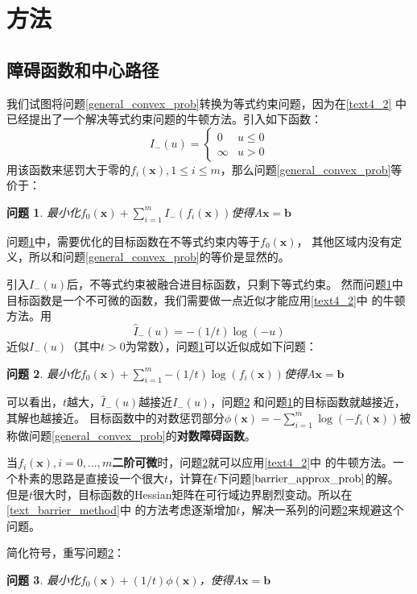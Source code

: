 \documentclass{article}
\newtheorem{problem}{问题}
\begin{document}
\section{方法}
\subsection{障碍函数和中心路径}
我们试图将问题\ref{general_convex_prob}转换为等式约束问题，因为在\ref{text4_2}
中已经提出了一个解决等式约束问题的牛顿方法。引入如下函数：
$$I_-(u)=\begin{cases}
    0 & u\le 0 \\
    \infty & u > 0
\end{cases}$$
用该函数来惩罚大于零的$f_i(\bm x),1\le i\le m$，那么问题\ref{general_convex_prob}等价于：
\begin{problem}
最小化$f_0(\bm x)+\sum_{i=1}^m{I_-(f_i(\bm x))}$使得$A\bm x=\bm b$
\label{barrier_problem}
\end{problem}

问题\ref{barrier_problem}中，需要优化的目标函数在不等式约束内等于$f_0(\bm x)$，
其他区域内没有定义，所以和问题\ref{general_convex_prob}的等价是显然的。

引入$I_-(u)$后，不等式约束被融合进目标函数，只剩下等式约束。
然而问题\ref{barrier_problem}中目标函数是一个不可微的函数，我们需要做一点近似才能应用\ref{text4_2}中
的牛顿方法。用
$$\widehat I_-(u)=-(1/t)\log(-u)$$
近似$I_-(u)$（其中$t>0$为常数），问题\ref{barrier_problem}可以近似成如下问题：
\begin{problem}
    最小化$f_0(\bm x)+\sum_{i=1}^m{-(1/t)\log(f_i(\bm x))}$使得$A\bm x=\bm b$
    \label{barrier_approx_prob}
\end{problem}

可以看出，$t$越大，$\widehat I_-(u)$越接近$I_-(u)$，问题\ref{barrier_approx_prob}
和问题\ref{barrier_problem}的目标函数就越接近，其解也越接近。
目标函数中的对数惩罚部分$\phi(\bm x)=-\sum_{i=1}^m\log (-f_i(\bm x))$被称做问题\ref{general_convex_prob}的\textbf{对数障碍函数}。

当$f_i(\bm x),i=0,...,m$\textbf{二阶可微}时，问题\ref{barrier_approx_prob}就可以应用\ref{text4_2}中
的牛顿方法。一个朴素的思路是直接设一个很大$t$，计算在$t$下问题$\ref{barrier_approx_prob}$的解。
但是$t$很大时，目标函数的Hessian矩阵在可行域边界剧烈变动。所以在\ref{text_barrier_method}中
的方法考虑逐渐增加$t$，解决一系列的问题\ref{barrier_approx_prob}来规避这个问题。

简化符号，重写问题\ref{barrier_approx_prob}：
\begin{problem}
    最小化$f_0(\bm x)+(1/t)\phi(\bm x)$，使得$A\bm x=\bm b$
    \label{barrier_approx_prob_simple}
\end{problem}
\end{document}
